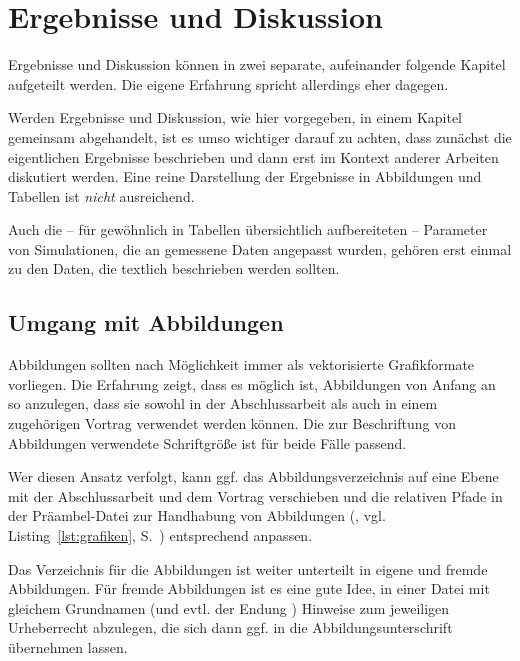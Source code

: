 %
%
%

\chapter{Ergebnisse und Diskussion}
\label{ch:ergebnisse_diskussion}

Ergebnisse und Diskussion können in zwei separate, aufeinander folgende Kapitel aufgeteilt werden. Die eigene Erfahrung spricht allerdings eher dagegen.

Werden Ergebnisse und Diskussion, wie hier vorgegeben, in einem Kapitel gemeinsam abgehandelt, ist es umso wichtiger darauf zu achten, dass zunächst die eigentlichen Ergebnisse beschrieben und dann erst im Kontext anderer Arbeiten diskutiert werden. Eine reine Darstellung der Ergebnisse in Abbildungen und Tabellen ist \emph{nicht} ausreichend.

Auch die -- für gewöhnlich in Tabellen übersichtlich aufbereiteten -- Parameter von Simulationen, die an gemessene Daten angepasst wurden, gehören  erst einmal zu den Daten, die textlich beschrieben werden sollten.



\section{Umgang mit Abbildungen}

Abbildungen sollten nach Möglichkeit immer als vektorisierte Grafikformate vorliegen. Die Erfahrung zeigt, dass es möglich ist, Abbildungen von Anfang an so anzulegen, dass sie sowohl in der Abschlussarbeit als auch in einem zugehörigen Vortrag verwendet werden können. Die zur Beschriftung von Abbildungen verwendete Schriftgröße ist für beide Fälle passend.

Wer diesen Ansatz verfolgt, kann ggf. das Abbildungsverzeichnis auf eine Ebene mit der Abschlussarbeit und dem Vortrag verschieben und die relativen Pfade in der Präambel-Datei zur Handhabung von Abbildungen (, vgl. Listing~\ref{lst:grafiken}, S.~\pageref{lst:grafiken}) entsprechend anpassen.

Das Verzeichnis für die Abbildungen ist weiter unterteilt in eigene und fremde Abbildungen. Für fremde Abbildungen ist es eine gute Idee, in einer Datei mit gleichem Grundnamen (und evtl. der Endung ) Hinweise zum jeweiligen Urheberrecht abzulegen, die sich dann ggf. in die Abbildungsunterschrift übernehmen lassen.

